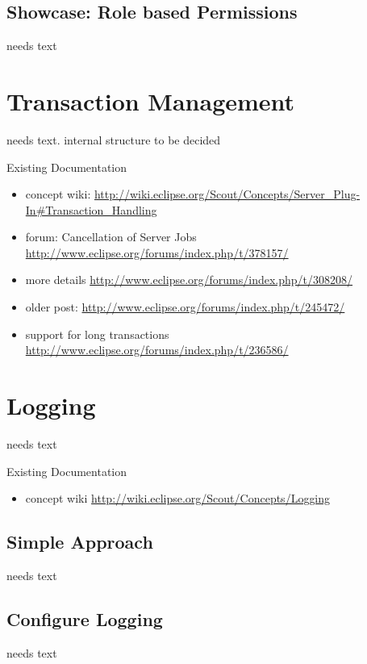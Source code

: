 \documentclass[a4paper,10pt,twoside]{book}
\begin{document}
\section{Showcase: Role based Permissions}
needs text

\chapter{Transaction Management}

needs text. internal structure to be decided

\noindent Existing Documentation
\begin{itemize}
  \item concept wiki: \url{http://wiki.eclipse.org/Scout/Concepts/Server_Plug-In#Transaction_Handling}
  \item forum: Cancellation of Server Jobs \url{http://www.eclipse.org/forums/index.php/t/378157/}
  \item more details \url{http://www.eclipse.org/forums/index.php/t/308208/}
  \item older post: \url{http://www.eclipse.org/forums/index.php/t/245472/}
  \item support for long transactions \url{http://www.eclipse.org/forums/index.php/t/236586/}  
\end{itemize}

\chapter{Logging}
needs text

\noindent Existing Documentation
\begin{itemize}
  \item concept wiki \url{http://wiki.eclipse.org/Scout/Concepts/Logging}
\end{itemize}

\section{Simple Approach}
needs text
  
\section{Configure Logging}
needs text
\end{document}
